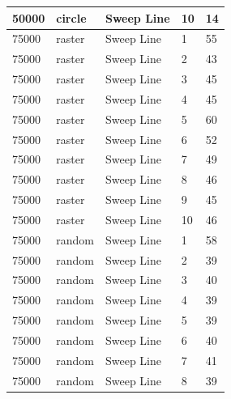 \documentclass[12pt]{article}
\begin{document}
\begin{longtable}{|l|l|l|l|l|}
50000        & circle            & Sweep Line & 10         & 14                            \\ \hline
75000        & raster            & Sweep Line & 1          & 55                            \\ \hline
75000        & raster            & Sweep Line & 2          & 43                            \\ \hline
75000        & raster            & Sweep Line & 3          & 45                            \\ \hline
75000        & raster            & Sweep Line & 4          & 45                            \\ \hline
75000        & raster            & Sweep Line & 5          & 60                            \\ \hline
75000        & raster            & Sweep Line & 6          & 52                            \\ \hline
75000        & raster            & Sweep Line & 7          & 49                            \\ \hline
75000        & raster            & Sweep Line & 8          & 46                            \\ \hline
75000        & raster            & Sweep Line & 9          & 45                            \\ \hline
75000        & raster            & Sweep Line & 10         & 46                            \\ \hline
75000        & random            & Sweep Line & 1          & 58                            \\ \hline
75000        & random            & Sweep Line & 2          & 39                            \\ \hline
75000        & random            & Sweep Line & 3          & 40                            \\ \hline
75000        & random            & Sweep Line & 4          & 39                            \\ \hline
75000        & random            & Sweep Line & 5          & 39                            \\ \hline
75000        & random            & Sweep Line & 6          & 40                            \\ \hline
75000        & random            & Sweep Line & 7          & 41                            \\ \hline
75000        & random            & Sweep Line & 8          & 39                            \\ \hline

\end{longtable}
\end{document}
